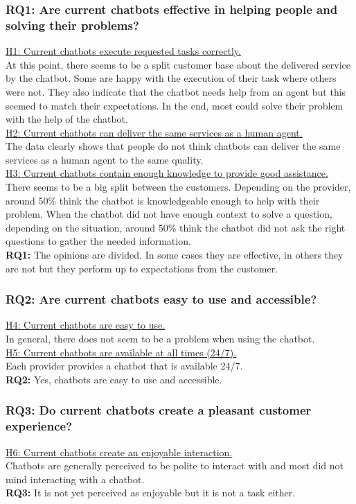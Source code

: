 \subsubsection{RQ1: Are current chatbots effective in helping people and
	solving their problems?}
\ul{H1: Current chatbots execute requested tasks correctly.}\\
At this point, there seems to be a split customer base about the delivered service by the chatbot. Some are happy with the execution of their task where others were not. They also indicate that the chatbot needs help from an agent but this seemed to match their expectations. In the end, most could solve their problem with the help of the chatbot.\\
\break
\ul{H2: Current chatbots can deliver the same services as a human
	agent.}\\
The data clearly shows that people do not think chatbots can deliver the same services as a human agent to the same quality.\\
\break
\ul{H3: Current chatbots contain enough knowledge to provide good
	assistance.}\\
There seems to be a big split between the customers. Depending on the provider, around 50\% think the chatbot is knowledgeable enough to help with their problem. When the chatbot did not have enough context to solve a question, depending on the situation, around 50\% think the chatbot did not ask the right questions to gather the needed information.\\
\break
\textbf{RQ1:} The opinions are divided. In some cases they are effective, in others they are not but they perform up to expectations from the customer.
\subsubsection{RQ2: Are current chatbots easy to use and accessible?}
\ul{H4: Current chatbots are easy to use.}\\
In general, there does not seem to be a problem when using the chatbot.\\
\break
\break
\ul{H5: Current chatbots are available at all times (24/7).}\\
Each provider provides a chatbot that is available 24/7.\\
\break
\textbf{RQ2:} Yes, chatbots are easy to use and accessible.
\subsubsection{RQ3: Do current chatbots create a pleasant customer experience?}
\ul{H6: Current chatbots create an enjoyable interaction.}\\
Chatbots are generally perceived to be polite to interact with and most did not mind interacting with a chatbot.\\
\break
\textbf{RQ3:} It is not yet perceived as enjoyable but it is not a task either.

